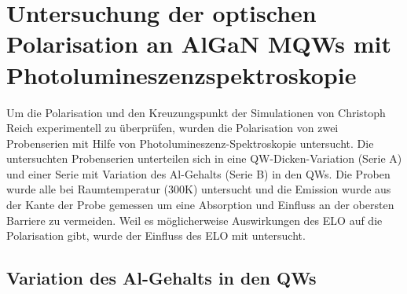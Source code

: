 \thispagestyle{fancy}

\section{Untersuchung der optischen Polarisation an AlGaN MQWs mit Photolumineszenzspektroskopie}
\label{sec:pol}

Um die Polarisation und den Kreuzungspunkt der Simulationen von Christoph Reich experimentell zu \"uberpr\"ufen, wurden die Polarisation von zwei Probenserien mit Hilfe von Photolumineszenz-Spektroskopie untersucht. Die untersuchten Probenserien unterteilen sich in eine QW-Dicken-Variation (Serie A) und einer Serie mit Variation des Al-Gehalts (Serie B) in den QWs. 
Die Proben wurde alle bei Raumtemperatur (300K) untersucht und die Emission wurde aus der Kante der Probe gemessen um eine Absorption und Einfluss an der obersten Barriere zu vermeiden. Weil es m\"oglicherweise Auswirkungen des ELO auf die Polarisation gibt, wurde der Einfluss des ELO mit untersucht. 

\subsection{Variation des Al-Gehalts in den QWs}


